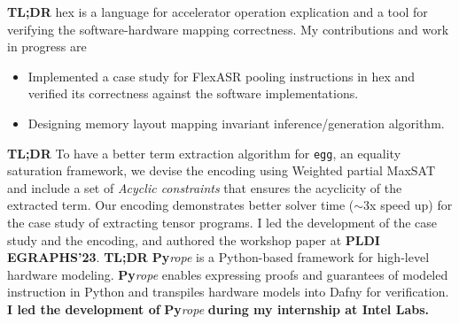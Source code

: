\documentclass{resume}
\begin{document}
\textbf{TL;DR} hex is a language for accelerator operation explication and a tool for verifying the software-hardware mapping correctness. My contributions and work in progress are
\begin{itemize}
    \item Implemented a case study for FlexASR pooling instructions in hex and verified its correctness against the software implementations.
    \item Designing memory layout mapping invariant inference/generation algorithm.
\end{itemize}
\textbf{TL;DR} To have a better term extraction algorithm for \texttt{egg}, an equality saturation framework, we devise the encoding using Weighted partial MaxSAT and include a set of \textit{Acyclic constraints} that ensures the acyclicity of the extracted term. Our encoding demonstrates better solver time ($\sim$3x speed up) for the case study of extracting tensor programs. I led the development of the case study and the encoding, and authored the workshop paper at \textbf{PLDI EGRAPHS'23}.
\textbf{TL;DR} \textbf{Py}\textit{rope} is a Python-based framework for high-level hardware modeling. \textbf{Py}\textit{rope} enables expressing proofs and guarantees of modeled instruction in Python and transpiles hardware models into Dafny for verification.
\textbf{I led the development of }\textbf{Py}\textit{rope}\textbf{ during my internship at Intel Labs.}
\end{document}
